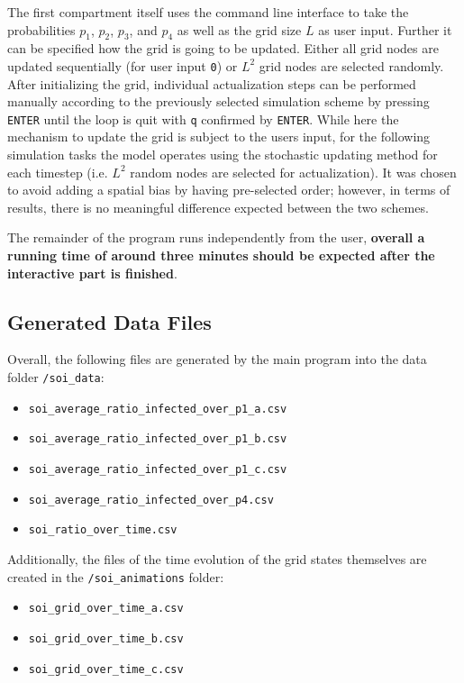 The first compartment itself uses the command line interface to take the probabilities $p_1$, $p_2$, $p_3$, and $p_4$ as well as the grid size $L$ as user input. Further it can be specified how the grid is going to be 
updated. Either all grid nodes are updated sequentially (for user input \texttt{0}) or $L^2$ grid nodes are selected randomly. After initializing the grid, 
individual actualization steps can be performed manually according to the previously selected simulation scheme by pressing \texttt{ENTER} until the loop is quit with \texttt{q} confirmed by \texttt{ENTER}.
While here the mechanism to update the grid is subject to the users input, for the following simulation tasks the model operates using the stochastic updating method for each timestep 
(i.e. $L^2$ random nodes are selected for actualization). It was chosen to avoid adding a spatial bias by having pre-selected order; however,
in terms of results, there is no meaningful difference expected between the two schemes.

The remainder of the program runs independently from the user, \textbf{overall a running time of around three minutes should be expected after the interactive part is finished}.


\subsection{Generated Data Files}

Overall, the following files are generated by the main program into the data folder \texttt{/soi\_data}:
\begin{itemize}
    \item \texttt{soi\_average\_ratio\_infected\_over\_p1\_a.csv}
    \item \texttt{soi\_average\_ratio\_infected\_over\_p1\_b.csv}
    \item \texttt{soi\_average\_ratio\_infected\_over\_p1\_c.csv}
    \item \texttt{soi\_average\_ratio\_infected\_over\_p4.csv}
    \item \texttt{soi\_ratio\_over\_time.csv}
\end{itemize}

Additionally, the files of the time evolution of the grid states themselves are created in the \texttt{/soi\_animations} folder:
\begin{itemize}
    \item \texttt{soi\_grid\_over\_time\_a.csv}
    \item \texttt{soi\_grid\_over\_time\_b.csv}
    \item \texttt{soi\_grid\_over\_time\_c.csv}
\end{itemize}